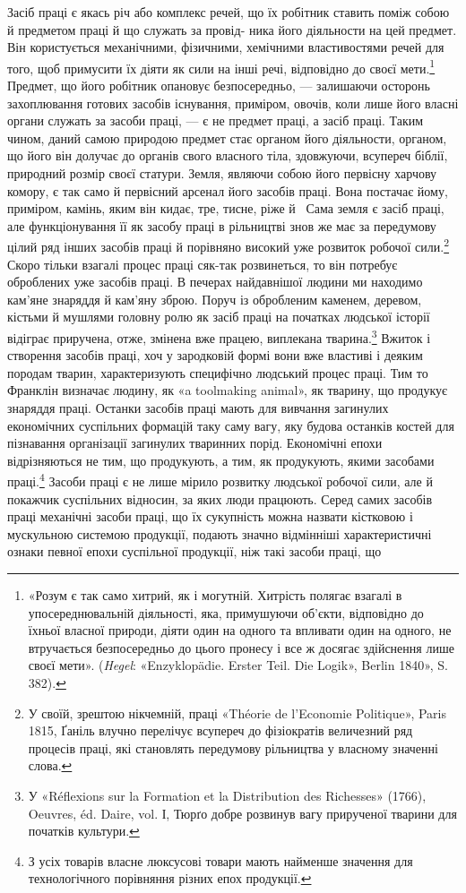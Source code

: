 Засіб праці є якась річ або комплекс речей, що їх робітник
ставить поміж собою й предметом праці й що служать за провід-
\parbreak{}
ника його діяльности на цей предмет. Він користується механічними,
фізичними, хемічними властивостями речей для того, щоб
примусити їх діяти як сили на інші речі, відповідно до своєї мети.\footnote{
«Розум є так само хитрий, як і могутній. Хитрість полягає взагалі
в упосереднювальній діяльності, яка, примушуючи об’єкти, відповідно
до їхньої власної природи, діяти один на одного та впливати один на
одного, не втручається безпосередньо до цього пронесу і все ж досягає
здійснення лише своєї мети». (\emph{Hegel}: «Enzyklopädie. Erster Teil. Die
Logik», Berlin 1840», S. 382).
}
Предмет, що його робітник опановує безпосередньо, — залишаючи
осторонь захоплювання готових засобів існування, приміром,
овочів, коли лише його власні органи служать за засоби праці, —
є не предмет праці, а засіб праці. Таким чином, даний самою
природою предмет стає органом його діяльности, органом, що
його він долучає до органів свого власного тіла, здовжуючи,
всупереч біблії, природний розмір своєї статури. Земля, являючи
собою його первісну харчову комору, є так само й первісний арсенал
його засобів праці. Вона постачає йому, приміром, камінь,
яким він кидає, тре, тисне, ріже й~ Сама земля є засіб праці,
але функціонування її як засобу праці в рільництві знов же
має за передумову цілий ряд інших засобів праці й порівняно
високий уже розвиток робочої сили.\footnote{
У своїй, зрештою нікчемній, праці «Théorie de l’Economie Politique»,
Paris 1815, Ґаніль влучно перелічує всупереч до фізіократів величезний
ряд процесів праці, які становлять передумову рільництва у власному
значенні слова.
} Скоро тільки взагалі процес
праці сяк-так розвинеться, то він потребує оброблених уже засобів
праці. В печерах найдавнішої людини ми находимо кам’яне
знаряддя й кам’яну зброю. Поруч із обробленим каменем, деревом,
кістьми й мушлями головну ролю як засіб праці на початках
людської історії відіграє приручена, отже, змінена вже працею,
виплекана тварина.\footnote{
У «Réflexions sur la Formation et la Distribution des Richesses»
(1766), Oeuvres, éd. Daire, vol. І, Тюрґо добре розвинув вагу прирученої
тварини для початків культури.
} Вжиток і створення засобів праці,
хоч у зародковій формі вони вже властиві і деяким породам тварин,
характеризують специфічно людський процес праці. Тим
то Франклін визначає людину, як «a toolmaking animal», як
тварину, що продукує знаряддя праці. Останки засобів праці
мають для вивчання загинулих економічних суспільних формацій
таку саму вагу, яку будова останків костей для пізнавання організації
загинулих тваринних порід. Економічні епохи відрізняються
не тим, що продукують, а тим, як продукують, якими
засобами праці.\footnote{
З усіх товарів власне люксусові товари мають найменше значення
для технологічного порівняння різних епох продукції.
} Засоби праці є не лише мірило розвитку людської
робочої сили, але й покажчик суспільних відносин, за яких
люди працюють. Серед самих засобів праці механічні засоби праці,
що їх сукупність можна назвати кістковою і мускульною системою
продукції, подають значно відмінніші характеристичні ознаки
певної епохи суспільної продукції, ніж такі засоби праці, що
\parbreak{}  %
